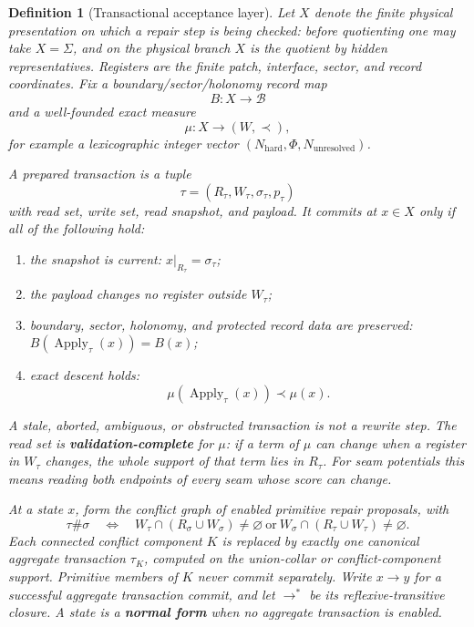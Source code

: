 \documentclass[11pt]{article}
\newtheorem{definition}[theorem]{Definition}
\theoremstyle{remark}
\theoremstyle{plain}
\begin{document}
\begin{definition}[Transactional acceptance layer]\label{def:transactional-repair}
Let \(X\) denote the finite physical presentation on which a repair step is being checked: before
quotienting one may take \(X=\Sigma\), and on the physical branch \(X\) is the quotient by hidden
representatives. Registers are the finite patch, interface, sector, and record coordinates. Fix a
boundary/sector/holonomy record map
\[
B:X\to\mathcal B
\]
and a well-founded exact measure
\[
\mu:X\to(W,\prec),
\]
for example a lexicographic integer vector
\((N_{\mathrm{hard}},\Phi,N_{\mathrm{unresolved}})\).

A prepared transaction is a tuple
\[
\tau=(R_\tau,W_\tau,\sigma_\tau,p_\tau)
\]
with read set, write set, read snapshot, and payload. It commits at \(x\in X\) only if all of the
following hold:
\begin{enumerate}[label=(\roman*),leftmargin=2em]
\item the snapshot is current: \(x|_{R_\tau}=\sigma_\tau\);
\item the payload changes no register outside \(W_\tau\);
\item boundary, sector, holonomy, and protected record data are preserved:
      \(B(\operatorname{Apply}_\tau(x))=B(x)\);
\item exact descent holds:
      \[
      \mu(\operatorname{Apply}_\tau(x))\prec \mu(x).
      \]
\end{enumerate}
A stale, aborted, ambiguous, or obstructed transaction is not a rewrite step. The read set is
\textbf{validation-complete} for \(\mu\): if a term of \(\mu\) can change when a register in
\(W_\tau\) changes, the whole support of that term lies in \(R_\tau\). For seam potentials this
means reading both endpoints of every seam whose score can change.

At a state \(x\), form the conflict graph of enabled primitive repair proposals, with
\[
\tau\#\sigma
\quad\Longleftrightarrow\quad
W_\tau\cap(R_\sigma\cup W_\sigma)\ne\varnothing
\ \text{or}\
W_\sigma\cap(R_\tau\cup W_\tau)\ne\varnothing .
\]
Each connected conflict component \(K\) is replaced by exactly one canonical aggregate transaction
\(\tau_K\), computed on the union-collar or conflict-component support. Primitive members of
\(K\) never commit separately. Write \(x\to y\) for a successful aggregate transaction commit, and
let \(\to^*\) be its reflexive-transitive closure. A state is a \textbf{normal form} when no
aggregate transaction is enabled.
\end{definition}
\end{document}
